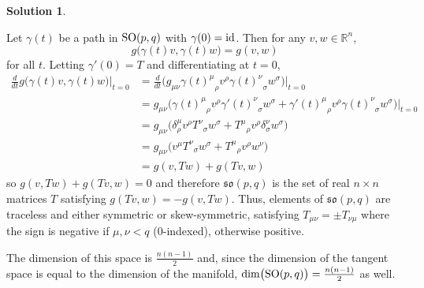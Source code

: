 \documentclass[11pt, a4paper]{report}
\theoremstyle{definition}
\newtheorem{solution}{Solution}[part]
\newenvironment{sol}{\begin{solution}}{\end{solution}\pagebreak[3]}
\newcommand*{\SO}{\ensuremath\text{SO}}
\newcommand*{\id}{\ensuremath\mathop{}\mathopen{}\mathrm{id}}
\begin{document}
\begin{sol}\label{sol:lorentzliealgebra}

Let $\gamma(t)$ be a path in $\SO(p, q)$ with $\gamma(0) = \id$. Then for any $v, w \in \mathbb{R}^n$,
\[
    g\bigl(\gamma(t)v, \gamma(t) w\bigr) = g(v, w)
\]
for all $t$. Letting $\gamma'(0) = T$ and differentiating at $t = 0$,
\begin{align*}
    \frac{d}{dt} g\bigl(\gamma(t)v, \gamma(t) w\bigr) \Big|_{t = 0} \! &=
        \frac{d}{dt} \bigl(
                g_{\mu\nu} {{\gamma(t)}^\mu}_\rho v^\rho {{\gamma(t)}^\nu}_\sigma w^\sigma
            \bigr) \Big|_{t = 0} \\
        &= g_{\mu\nu} \bigl(
                {{\gamma(t)}^\mu}_\rho v^\rho {{\gamma'(t)}^\nu}_\sigma w^\sigma
                + {{\gamma'(t)}^\mu}_\rho v^\rho {{\gamma(t)}^\nu}_\sigma w^\sigma
            \bigr) \Big|_{t = 0} \\
        &= g_{\mu\nu} \bigl(
                \delta^\mu_\rho v^\rho {T^\nu}_\sigma w^\sigma
                + {T^\mu}_\rho v^\rho \delta^\nu_\sigma w^\sigma
           \bigr) \\
        &= g_{\mu\nu} \bigl(
                v^\mu {T^\nu}_\sigma w^\sigma + {T^\mu}_\rho v^\rho w^\nu
           \bigr) \\
        &= g(v, Tw) + g(Tv, w)
\end{align*}
so $g(v, Tw) + g(Tv, w) = 0$
and therefore $\mathfrak{so}(p, q)$ is the set of real $n \times n$ matrices $T$ satisfying $g(Tv, w) = -g(v, Tw)$.
Thus, elements of $\mathfrak{so}(p, q)$ are traceless and either symmetric or skew-symmetric, satisfying $T_{\mu\nu} = \pm T_{\nu\mu}$ where the sign is negative if $\mu, \nu < q$ (0-indexed), otherwise positive.

The dimension of this space is $\frac{n(n - 1)}{2}$ and,
since the dimension of the tangent space is equal to the dimension of the manifold,
$\dim\bigl(\SO(p, q)\bigr) = \frac{n(n - 1)}{2}$ as well.


\end{sol}
\end{document}
